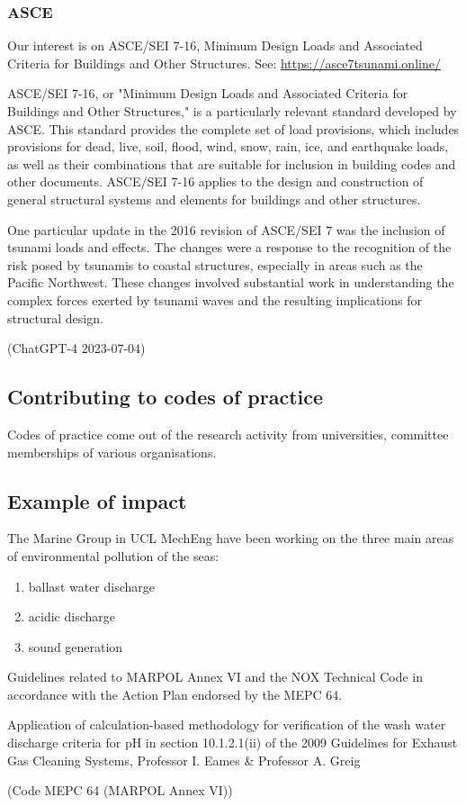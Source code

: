 \subsubsection{ASCE}
Our interest is on ASCE/SEI 7-16, Minimum Design Loads and Associated Criteria for Buildings and Other Structures. See: \url{https://asce7tsunami.online/}
\begin{quoting}
    ASCE/SEI 7-16, or "Minimum Design Loads and Associated Criteria for Buildings and Other Structures," is a particularly relevant standard developed by ASCE. This standard provides the complete set of load provisions, which includes provisions for dead, live, soil, flood, wind, snow, rain, ice, and earthquake loads, as well as their combinations that are suitable for inclusion in building codes and other documents. ASCE/SEI 7-16 applies to the design and construction of general structural systems and elements for buildings and other structures.

    One particular update in the 2016 revision of ASCE/SEI 7 was the inclusion of tsunami loads and effects. The changes were a response to the recognition of the risk posed by tsunamis to coastal structures, especially in areas such as the Pacific Northwest. These changes involved substantial work in understanding the complex forces exerted by tsunami waves and the resulting implications for structural design.

    (ChatGPT-4 2023-07-04)
\end{quoting}
\subsection{Contributing to codes of practice}
Codes of practice come out of the research activity from universities, committee memberships of various organisations.
\subsection{Example of impact}
The Marine Group in UCL MechEng have been working on the three main areas of environmental pollution of the seas:
\begin{enumerate}
    \item ballast water discharge
    \item acidic discharge
    \item sound generation
\end{enumerate}
Guidelines related to MARPOL Annex VI and the NOX Technical Code in accordance with the Action Plan endorsed by the MEPC 64.
\begin{quoting}
    Application of calculation-based methodology for verification of the wash water discharge criteria for pH in section 10.1.2.1(ii) of the 2009 Guidelines for Exhaust Gas Cleaning Systems, Professor I. Eames \& Professor A. Greig

    (Code MEPC 64 (MARPOL Annex VI))
\end{quoting}
